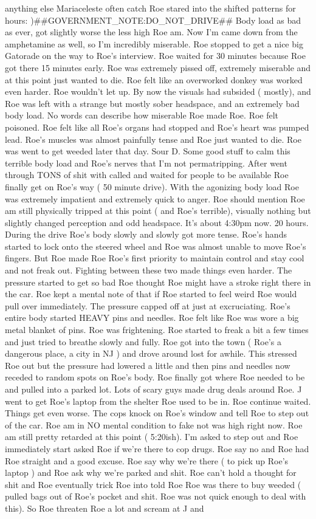\documentclass[12pt]{book}
\begin{document}
anything else Mariaceleste often catch Roe stared into the shifted patterns for hours: )\#\#GOVERNMENT\_NOTE:DO\_NOT\_DRIVE\#\# Body load as bad as ever, got slightly worse the less high Roe am. Now I'm came down from the amphetamine as well, so I'm incredibly miserable. Roe stopped to get a nice big Gatorade on the way to Roe's interview. Roe waited for 30 minutes because Roe got there 15 minutes early. Roe was extremely pissed off, extremely miserable and at this point just wanted to die. Roe felt like an overworked donkey was worked even harder. Roe wouldn't let up. By now the visuals had subsided ( mostly), and Roe was left with a strange but mostly sober headspace, and an extremely bad body load. No words can describe how miserable Roe made Roe. Roe felt poisoned. Roe felt like all Roe's organs had stopped and Roe's heart was pumped lead. Roe's muscles was almost painfully tense and Roe just wanted to die. Roe was went to get weeded later that day. Sour D. Some good stuff to calm this terrible body load and Roe's nerves that I'm not permatripping. After went through TONS of shit with called and waited for people to be available Roe finally get on Roe's way ( 50 minute drive). With the agonizing body load Roe was extremely impatient and extremely quick to anger. Roe should mention Roe am still physically tripped at this point ( and Roe's terrible), visually nothing but slightly changed perception and odd headspace. It's about 4:30pm now. 20 hours. During the drive Roe's body slowly and slowly got more tense. Roe's hands started to lock onto the steered wheel and Roe was almost unable to move Roe's fingers. But Roe made Roe Roe's first priority to maintain control and stay cool and not freak out. Fighting between these two made things even harder. The pressure started to get so bad Roe thought Roe might have a stroke right there in the car. Roe kept a mental note of that if Roe started to feel weird Roe would pull over immediately. The pressure capped off at just at excruciating. Roe's entire body started HEAVY pins and needles. Roe felt like Roe was wore a big metal blanket of pins. Roe was frightening. Roe started to freak a bit a few times and just tried to breathe slowly and fully. Roe got into the town ( Roe's a dangerous place, a city in NJ ) and drove around lost for awhile. This stressed Roe out but the pressure had lowered a little and then pins and needles now receded to random spots on Roe's body. Roe finally got where Roe needed to be and pulled into a parked lot. Lots of scary guys made drug deals around Roe. J went to get Roe's laptop from the shelter Roe used to be in. Roe continue waited. Things get even worse. The cops knock on Roe's window and tell Roe to step out of the car. Roe am in NO mental condition to fake not was high right now. Roe am still pretty retarded at this point ( 5:20ish). I'm asked to step out and Roe immediately start asked Roe if we're there to cop drugs. Roe say no and Roe had Roe straight and a good excuse. Roe say why we're there ( to pick up Roe's laptop ) and Roe ask why we're parked and shit. Roe can't hold a thought for shit and Roe eventually trick Roe into told Roe Roe was there to buy weeded ( pulled bags out of Roe's pocket and shit. Roe was not quick enough to deal with this). So Roe threaten Roe a lot and scream at J and 
\end{document}

